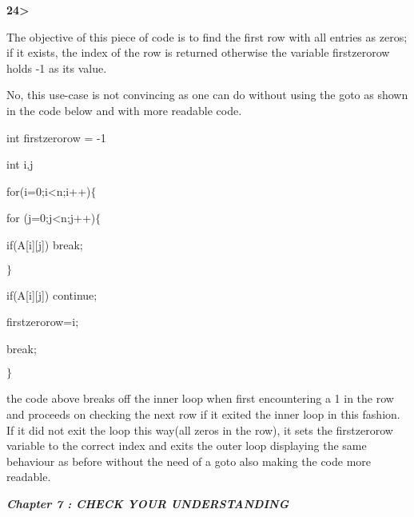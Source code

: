 \documentclass[12pt]{article}
\renewcommand{\_}{\kern-1.5pt\textunderscore\kern-1.5pt}
\begin{document}
\vspace{\baselineskip}
\textbf{24>}\par

The objective of this piece of code is to find the first row with all entries as zeros; if it exists, the index of the row is returned otherwise the variable first\_zero\_row holds -1 as its value.\par


\vspace{\baselineskip}
No, this use-case is not convincing as one can do without using the goto as shown in the code below and with more readable code.\par


\vspace{\baselineskip}
int first\_zero\_row = -1\par

int i,j\par

for(i=0;i<n;i++)$ \{ $ \par

\tab for (j=0;j<n;j++)$ \{ $ \par

\tab \tab if(A[i][j]) break;\par

\tab $ \} $ \par

\tab if(A[i][j]) continue;\par

\tab first\_zero\_row=i;\par

\tab break;\par

$ \} $ \par


\vspace{\baselineskip}
the code above breaks off the inner loop when first encountering a 1 in the row and proceeds on checking the next row if it exited the inner loop in this fashion. If it did not exit the loop this way(all zeros in the row), it sets the first\_zero\_row variable to the correct index and exits the outer loop displaying the same behaviour as before without the need of a goto also making the code more readable.\par




\newpage

\vspace{\baselineskip}\textbf{\textit{Chapter 7 : CHECK YOUR UNDERSTANDING}}\par
\end{document}
